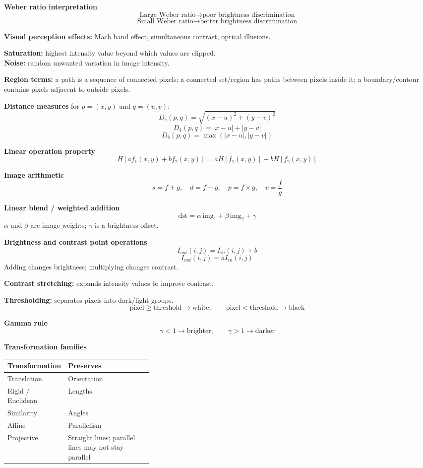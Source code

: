 \documentclass[8pt]{extarticle}
\begin{document}
\begin{multicols}{2}
\textbf{Weber ratio interpretation}
\[
\text{Large Weber ratio}\rightarrow\text{poor brightness discrimination}
\]
\[
\text{Small Weber ratio}\rightarrow\text{better brightness discrimination}
\]

\textbf{Visual perception effects:} Mach band effect, simultaneous contrast, optical illusions.

\textbf{Saturation:} highest intensity value beyond which values are clipped.\\
\textbf{Noise:} random unwanted variation in image intensity.

\textbf{Region terms:} a path is a sequence of connected pixels; a connected set/region has paths between pixels inside it; a boundary/contour contains pixels adjacent to outside pixels.

\textbf{Distance measures} for $p=(x,y)$ and $q=(u,v)$:
\[
D_e(p,q)=\sqrt{(x-u)^2+(y-v)^2}
\]
\[
D_4(p,q)=|x-u|+|y-v|
\]
\[
D_8(p,q)=\max(|x-u|,|y-v|)
\]

\textbf{Linear operation property}
\[
H[af_1(x,y)+bf_2(x,y)]=aH[f_1(x,y)]+bH[f_2(x,y)]
\]

\textbf{Image arithmetic}
\[
s=f+g,\quad d=f-g,\quad p=f\times g,\quad v=\frac{f}{g}
\]

\textbf{Linear blend / weighted addition}
\[
\text{dst}=\alpha\,\text{img}_1+\beta\,\text{img}_2+\gamma
\]
$\alpha$ and $\beta$ are image weights; $\gamma$ is a brightness offset.

\textbf{Brightness and contrast point operations}
\[
I_{out}(i,j)=I_{in}(i,j)+b
\]
\[
I_{out}(i,j)=aI_{in}(i,j)
\]
Adding changes brightness; multiplying changes contrast.

\textbf{Contrast stretching:} expands intensity values to improve contrast.

\textbf{Thresholding:} separates pixels into dark/light groups.
\[
\text{pixel}\ge\text{threshold}\rightarrow\text{white},\qquad
\text{pixel}<\text{threshold}\rightarrow\text{black}
\]

\textbf{Gamma rule}
\[
\gamma<1\rightarrow\text{brighter},\qquad \gamma>1\rightarrow\text{darker}
\]

\textbf{Transformation families}

\begin{tabularx}{\linewidth}{@{}p{0.34\linewidth}Y@{}}
\toprule
\textbf{Transformation} & \textbf{Preserves} \\
\midrule
Translation & Orientation \\
Rigid / Euclidean & Lengths \\
Similarity & Angles \\
Affine & Parallelism \\
Projective & Straight lines; parallel lines may not stay parallel \\
\bottomrule
\end{tabularx}


\end{multicols}
\end{document}
